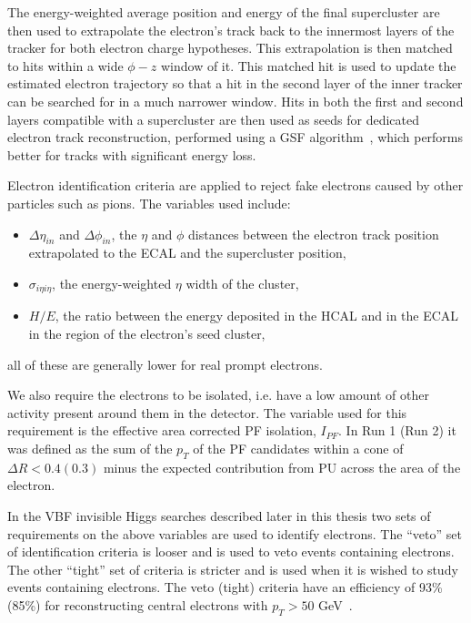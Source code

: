 The energy-weighted average position and energy of the final supercluster are then used to extrapolate the electron's track back to the innermost layers of the tracker for both electron charge hypotheses. This extrapolation is then matched to hits within a wide $\phi - z$ window of it. This matched hit is used to update the estimated electron trajectory so that a hit in the second layer of the inner tracker can be searched for in a much narrower window. Hits in both the first and second layers compatible with a supercluster are then used as seeds for dedicated electron track reconstruction, performed using a \ac{GSF} algorithm~\cite{GSFalgorithm}, which performs better for tracks with significant energy loss.

Electron identification criteria are applied to reject fake electrons caused by other particles such as pions. The variables used include:
\begin{itemize}
\item $\Delta\eta_{in}$ and $\Delta\phi_{in}$, the $\eta$ and $\phi$ distances between the electron track position extrapolated to the \ac{ECAL} and the supercluster position,
\item $\sigma_{i\eta i\eta}$, the energy-weighted $\eta$ width of the cluster,
\item $H/E$, the ratio between the energy deposited in the \ac{HCAL} and in the \ac{ECAL} in the region of the electron's seed cluster,
\end{itemize}
all of these are generally lower for real prompt electrons.

We also require the electrons to be isolated, i.e. have a low amount of other activity present around them in the detector. The variable used for this requirement is the effective area corrected \ac{PF} isolation, $I_{PF}$. In Run 1 (Run 2) it was defined as the sum of the $p_{T}$ of the \ac{PF} candidates within a cone of $\Delta R<0.4(0.3)$ minus the expected contribution from \ac{PU} across the area of the electron.

In the \ac{VBF} invisible Higgs searches described later in this thesis two sets of requirements on the above variables are used to identify electrons. The ``veto'' set of identification criteria is looser and is used to veto events containing electrons. The other ``tight'' set of criteria is stricter and is used when it is wished to study events containing electrons. The veto (tight) criteria have an efficiency of 93\% (85\%) for reconstructing central electrons with $p_{T}>50$ GeV~\cite{eleeff}.

